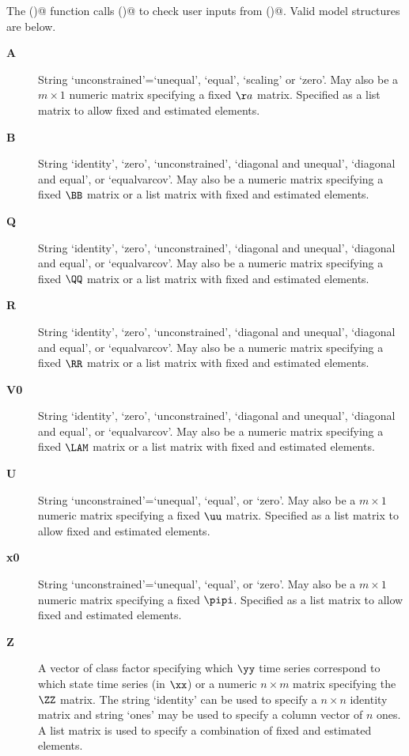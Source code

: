   The \verb@popWrap()@ function calls \verb@checkPopWrap()@ to check user inputs from \verb@MARSS()@. Valid model structures are below.  

  \begin{description}   
    \item[\textbf{A}]{ String `unconstrained'=`unequal', `equal', `scaling' or `zero'. May also be a $m \times 1$ numeric matrix specifying a fixed $\aa$ matrix. Specified as a list matrix to allow fixed and estimated elements. }
    \item[\textbf{B}]{ String `identity', `zero', `unconstrained', `diagonal and unequal', `diagonal and equal', or `equalvarcov'. May also be a numeric matrix specifying a fixed $\BB$ matrix or a list matrix with fixed and estimated elements. } 
    \item[\textbf{Q}]{ String `identity', `zero', `unconstrained', `diagonal and unequal', `diagonal and equal', or `equalvarcov'. May also be a numeric matrix specifying a fixed $\QQ$ matrix or a list matrix with fixed and estimated elements. } 
    \item[\textbf{R}]{ String `identity', `zero', `unconstrained', `diagonal and unequal', `diagonal and equal', or `equalvarcov'. May also be a numeric matrix specifying a fixed $\RR$ matrix or a list matrix with fixed and estimated elements. }
    \item[\textbf{V0}]{ String `identity', `zero', `unconstrained', `diagonal and unequal', `diagonal and equal', or `equalvarcov'. May also be a numeric matrix specifying a fixed $\LAM$ matrix or a list matrix with fixed and estimated elements. }
    \item[\textbf{U}]{ String `unconstrained'=`unequal', `equal', or `zero'. May also be a $m \times 1$ numeric matrix specifying a fixed $\uu$ matrix. Specified as a list matrix to allow fixed and estimated elements.}
    \item[\textbf{x0}]{ String `unconstrained'=`unequal', `equal', or `zero'. May also be a $m \times 1$ numeric matrix specifying a fixed $\pipi$. Specified as a list matrix to allow fixed and estimated elements.}
    \item[\textbf{Z}]{ A vector  of class factor specifying which $\yy$ time series correspond to which state time series (in $\xx$) or a numeric $n \times m$ matrix specifying the $\ZZ$ matrix. The string `identity' can be used to specify a $n \times n$ identity matrix and string `ones' may be used to specify a column vector of $n$ ones.  A list matrix is used to specify a combination of fixed and estimated elements.}
  \end{description}
  

